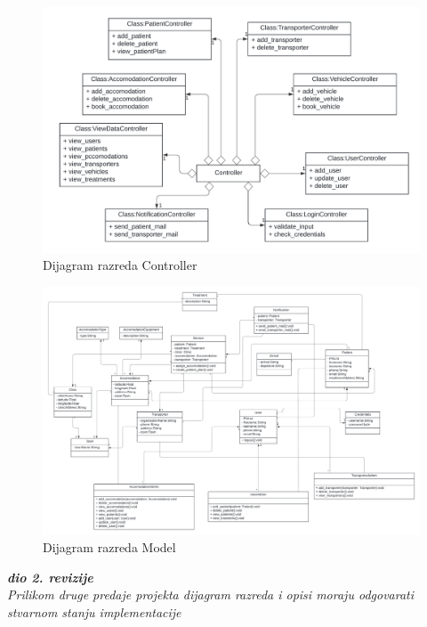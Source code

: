 			\begin{figure}[H]
				\includegraphics[width=\textwidth]{slike/UML_controller.PNG} %
				\caption{Dijagram razreda Controller}
				\label{fig:uml_controller} %
			\end{figure}
			
			\begin{figure}[H]
				\includegraphics[width=\textwidth]{slike/UML_model.PNG} %
				\caption{Dijagram razreda Model}
				\label{fig:uml_model} %
			\end{figure}
			
			\textbf{\textit{dio 2. revizije}}\\			
			
			\textit{Prilikom druge predaje projekta dijagram razreda i opisi moraju odgovarati stvarnom stanju implementacije}
			
